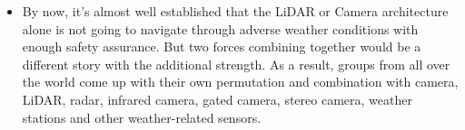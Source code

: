 \documentclass[rnd]{mas_proposal}
\begin{document}
\begin{itemize}


      \item By now, it’s almost well established that the LiDAR or Camera architecture alone is not going to navigate through adverse weather conditions with enough safety assurance. But two forces combining together would be a different story with the additional strength. As a result, groups from all over the world come up with their own permutation and combination with camera, LiDAR, radar, infrared camera, gated camera, stereo camera, weather stations and other weather-related sensors.


\end{itemize}
\end{document}
